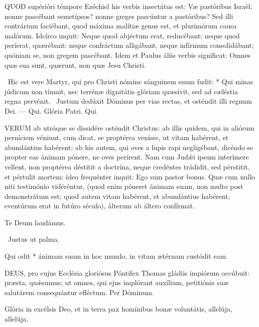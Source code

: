 
\lettrine[lines=2]{Q}{UOD} supérióri témpore Ezéchiel his verbis insectátus est: Væ pastóribus Israël: nonne pascébant semetípsos? nonne greges pascúntur a pastóribus? Sed illi contrárium faciébant, quod máxima malítiæ genus est, et plurimórum causa malórum. Idcírco inquit: Neque quod abjéctum erat, reducébant: neque quod períerat, quærébant: neque confráctum alligábant, neque infírmum consolidábant; quóniam se, non gregem pascébant. Idem et Paulus áliis verbis signíficat: Omnes quæ sua sunt, quærunt, non quæ Jesu Christi.

\R\ Hic est vere Martyr, qui pro Christi nómine sánguinem suum fudit: * Qui minas júdicum non tímuit, nec terrénæ dignitátis glóriam quæsívit, sed ad cæléstia regna pervénit. \V\ Justum dedúxit Dóminus per vias rectas, et osténdit illi regnum Dei. --- Qui. Glória Patri. Qui.


\lettrine[lines=2]{V}{ERUM} ab utróque se dissidére osténdit Christus: ab illis quidem, qui in aliórum perníciem véniunt, cum dicat, se proptérea venísse, ut vitam habérent, et abundántius habérent; ab his autem, qui oves a lupis rapi negligébant, dicéndo se propter eas ánimam pónere, ne oves perírent. Nam cum Judǽi ipsum interímere vellent, non proptérea déstitit a doctrína, neque credéntes trádidit, sed pérstitit, et pértulit mortem: ídeo frequénter inquit: Ego sum pastor bonus. Quæ cum nullo niti testimónio vidéréntur, (quod enim póneret ánimam suam, non multo post demonstrátum est; quod autem vitam habérent, et abundántius habérent, eventúrum erat in futúro século), álterum ab áltero confírmat.

 Te Deum laudámus.


\V\ Justus ut palma.

 Qui odit * ánimam suam in hoc mundo, in vitam ætérnam custódit eam.


\lettrine[lines=2]{D}{EUS}, pro cujus Ecclésia gloriósus Póntifex Thomas gládiis impiórum occúbuit: præsta, quǽsumus; ut omnes, qui ejus implórant auxílium, petitiónis suæ salutárem consequántur efféctum. Per Dóminum.


 Glória in excélsis Deo, et in terra pax homínibus bonæ voluntátis, allelúja, allelúja.

